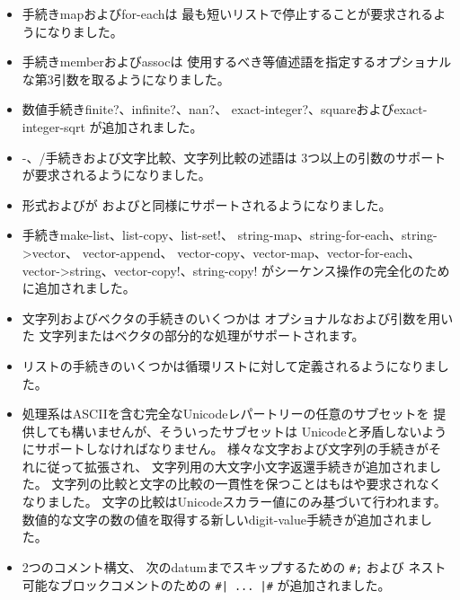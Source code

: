 \begin{itemize}
\item 手続き{\cf map}および{\cf for-each}は
最も短いリストで停止することが要求されるようになりました。

\item 手続き{\cf member}および{\cf assoc}は
使用するべき等値述語を指定するオプショナルな第3引数を取るようになりました。

\item 数値手続き{\cf finite?}、{\cf infinite?}、{\cf nan?}、
{\cf exact-\+integer?}、{\cf square}および{\cf exact-\+integer-\+sqrt}
が追加されました。

\item {\cf -}、{\cf /}手続きおよび文字比較、文字列比較の述語は
3つ以上の引数のサポートが要求されるようになりました。

\item 形式\sharptrue{}および\sharpfalse{}が
\schtrue{}および\schfalse{}と同様にサポートされるようになりました。

\item 手続き{\cf make-\+list}、{\cf list-\+copy}、{\cf list-\+set!}、
{\cf string-\+map}、{\cf string-\+for-\+each}、{\cf string->\+vector}、
{\cf vector-\+append}、
{\cf vector-\+copy}、{\cf vector-\+map}、{\cf vector-\+for-\+each}、
{\cf vector->\+string}、{\cf vector-\+copy!}、{\cf string-\+copy!}
がシーケンス操作の完全化のために追加されました。

\item 文字列およびベクタの手続きのいくつかは
オプショナルなおよび引数を用いた
文字列またはベクタの部分的な処理がサポートされます。

\item リストの手続きのいくつかは循環リストに対して定義されるようになりました。

\item 処理系はASCIIを含む完全なUnicodeレパートリーの任意のサブセットを
提供しても構いませんが、そういったサブセットは
Unicodeと矛盾しないようにサポートしなければなりません。
様々な文字および文字列の手続きがそれに従って拡張され、
文字列用の大文字小文字返還手続きが追加されました。
文字列の比較と文字の比較の一貫性を保つことはもはや要求されなくなりました。
文字の比較はUnicodeスカラー値にのみ基づいて行われます。
数値的な文字の数の値を取得する新しい{\cf digit-value}手続きが追加されました。

\item 2つのコメント構文、
次のdatumまでスキップするための {\tt \#;} および
ネスト可能なブロックコメントのための {\tt \#| ... |\#}
が追加されました。


\end{itemize}
